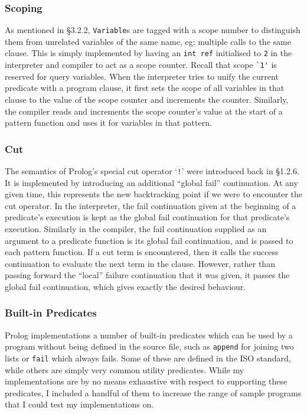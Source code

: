 \documentclass[12pt]{article}
\begin{document}
\subsubsection{Scoping}

As mentioned in \S3.2.2, \verb|Variable|s are tagged with a scope number to distinguish them from unrelated variables of the same name, eg: multiple calls to the same clause.
This is simply implemented by having an \verb|int ref| initialised to \verb|2| in the interpreter and compiler to act as a scope counter.
Recall that scope \verb|`1'| is reserved for query variables.
When the interpreter tries to unify the current predicate with a program clause, it first sets the scope of all variables in that clause to the value of the scope counter and increments the counter. 
Similarly, the compiler reads and increments the scope counter's value at the start of a pattern function and uses it for variables in that pattern.

\subsubsection{Cut}

The semantics of Prolog's special cut operator `\verb|!|' were introduced back in \S1.2.6.
It is implemented by introducing an additional ``global fail'' continuation. 
At any given time, this represents the new backtracking point if we were to encounter the cut operator. 
In the interpreter, the fail continuation given at the beginning of a predicate's execution is kept as the global fail continuation for that predicate's execution. 
Similarly in the compiler, the fail continuation supplied as an argument to a predicate function is its global fail continuation, and is passed to each pattern function.
If a cut term is encountered, then it calls the success continuation to evaluate the next term in the clause.
However, rather than passing forward the ``local'' failure continuation that it was given, it passes the global fail continuation, which gives exactly the desired behaviour.

\subsubsection{Built-in Predicates}

Prolog implementations a number of built-in predicates which can be used by a program without being defined in the source file, such as \verb|append| for joining two lists or \verb|fail| which always fails. 
Some of these are defined in the ISO standard, while others are simply very common utility predicates.
While my implementations are by no means exhaustive with respect to supporting these predicates, I included a handful of them to increase the range of sample programs that I could test my implementations on.
\end{document}
